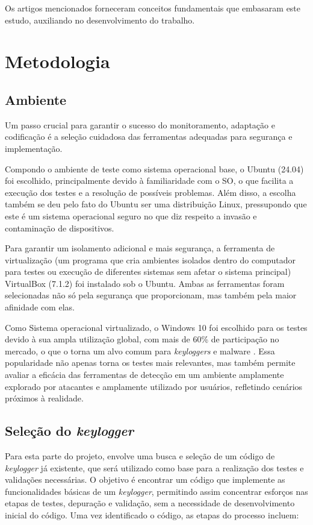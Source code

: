 \documentclass[12pt]{article}
\begin{document}
Os artigos mencionados forneceram conceitos fundamentais que embasaram este estudo, 
auxiliando no desenvolvimento do trabalho.
\section{Metodologia}
\subsection{Ambiente}
Um passo crucial para garantir o sucesso do monitoramento, adaptação e codificação é a seleção cuidadosa das ferramentas adequadas para segurança e implementação.

Compondo o ambiente de teste como sistema operacional base, 
o Ubuntu (24.04) foi escolhido, principalmente devido à familiaridade com o SO, 
o que facilita a execução dos testes e a resolução de possíveis problemas. 
Além disso, a escolha também se deu pelo fato do Ubuntu ser uma distribuição Linux, 
pressupondo que este é um sistema operacional seguro no que diz respeito a invasão e contaminação de dispositivos.

Para garantir um isolamento adicional e mais segurança, 
a ferramenta de virtualização (um programa que cria ambientes isolados dentro do computador
para testes ou execução de diferentes sistemas sem afetar o sistema principal) VirtualBox (7.1.2) foi instalado sob o Ubuntu.
Ambas as ferramentas foram selecionadas não só pela segurança que proporcionam, 
mas também pela maior afinidade com elas.

Como Sistema operacional virtualizado, o Windows 10 foi escolhido para os testes devido à sua ampla utilização global,
com mais de 60\% de participação no mercado, o que o 
torna um alvo comum para \textit{keyloggers} e malware \citep{tomshardware2023}. 
Essa popularidade não apenas torna os testes mais relevantes, mas também
permite avaliar a eficácia das ferramentas de detecção em um ambiente 
amplamente explorado por atacantes e amplamente utilizado por usuários, 
refletindo cenários próximos à realidade.

\subsection{Seleção do \textit{keylogger}}
Para esta parte do projeto, envolve uma busca e seleção de um código de \textit{keylogger} já existente, que será utilizado como base para a realização dos testes e validações necessárias. O objetivo é encontrar um código que implemente as funcionalidades básicas de um \textit{keylogger}, permitindo assim concentrar esforços nas etapas de testes, depuração e validação, sem a necessidade de desenvolvimento inicial do código. Uma vez identificado o código, as etapas do processo incluem:
\end{document}
